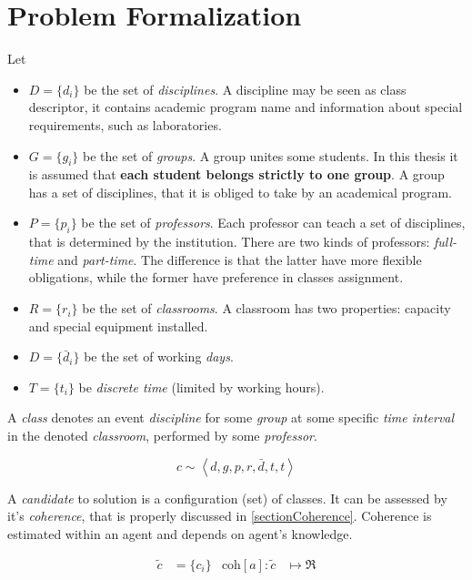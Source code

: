 



\def\coh{\mathrm{coh}}


%

\section{Problem Formalization}

Let \begin{itemize}
\item $D=\{d_i\}$ be the set of \emph{disciplines}.
  A discipline may be seen as class descriptor, it contains
  academic program name and information about special requirements,
  such as laboratories.
\item $G=\{g_i\}$ be the set of \emph{groups}.
  A group unites some students. In this thesis it is assumed that
  \textbf{each student belongs strictly to one group}.
  A group has a set of disciplines, that it is obliged to take by an
  academical program.
\item $P=\{p_i\}$ be the set of \emph{professors}.
  Each professor can teach a set of disciplines, that is determined
  by the institution. There are two kinds of professors:
  \emph{full-time} and \emph{part-time}. The difference is that the
  latter have more flexible obligations, while the former have preference
  in classes assignment.
\item $R=\{r_i\}$ be the set of \emph{classrooms}.
  A classroom has two properties: capacity and special equipment installed.
\item $D=\{\bar d_i\}$ be the set of working \emph{days}.
\item $T=\{t_i\}$ be \emph{discrete time} (limited by working hours).
\end{itemize}
\medskip

A \emph{class} denotes an event \emph{discipline} for some \emph{group}
at some specific \emph{time interval} in the denoted \emph{classroom},
performed by some \emph{professor}.

$$ c \sim \left< d, g, p, r, \bar d, t, t \right> $$
\medskip

A \emph{candidate} to solution is a configuration (set) of classes.
It can be assessed by it's \emph{coherence}, that is properly discussed
in \ref{sectionCoherence}. Coherence is estimated within an agent and
depends on agent's knowledge.

\begin{align*}
 \tilde{c} &= \{c_i\}  &\coh[a]: \tilde c &\mapsto \Re
\end{align*}



